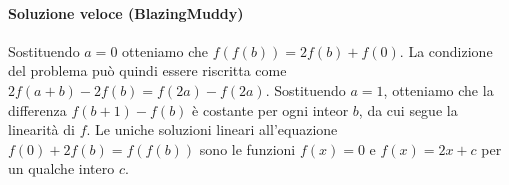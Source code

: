 \documentclass{article}
\begin{document}
\paragraph{Soluzione veloce (BlazingMuddy)}
Sostituendo $a=0$ otteniamo che $f(f(b))=2f(b)+f(0)$.
La condizione del problema può quindi essere riscritta come
$2f(a+b)-2f(b)=f(2a)-f(2a)$. Sostituendo $a=1$, otteniamo che
la differenza $f(b+1)-f(b)$ è costante per ogni inteor $b$, da
cui segue la linearità di $f$. Le uniche soluzioni
lineari all'equazione $f(0)+2f(b)=f(f(b))$ sono le funzioni
$f(x)=0$ e $f(x)=2x+c$ per un qualche intero $c$.
\end{document}
